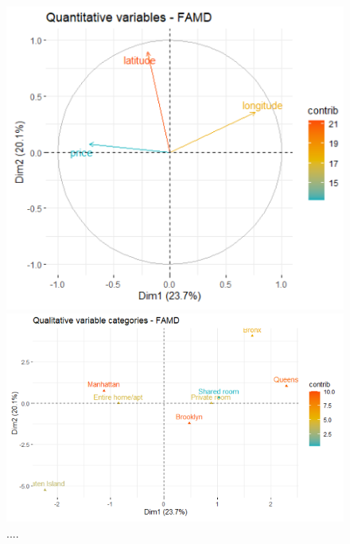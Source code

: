 \documentclass{FR16}
\begin{document}
\begin{figure}[!htb]
   \begin{minipage}{0.48\textwidth}
     \centering
    \includegraphics[width=1\textwidth]{figures/FAMD3.PNG} 
 \caption{\label{fig:31} ...}
   \end{minipage}\hfill
   \begin{minipage}{0.48\textwidth}
     \centering
       \includegraphics[width=1\textwidth]{figures/FAMD4.PNG} 
 \caption{\label{fig:32} .... }
   \end{minipage}
   
\end{figure}
\end{document}
